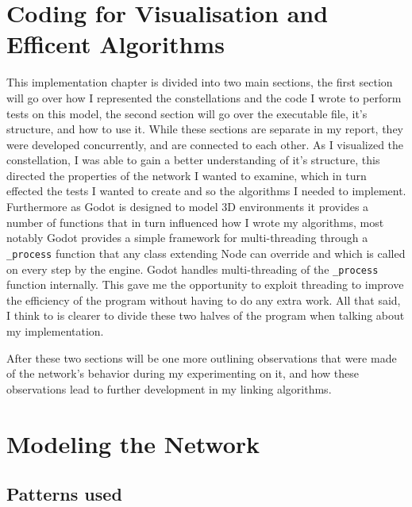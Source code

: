 \documentclass[12pt]{report}
\begin{document}
\section{Coding for Visualisation and Efficent Algorithms}

This implementation chapter is divided into two main sections, the first section will go over how I represented the constellations and the code I wrote to perform tests on this model, the second section will go over the executable file, it's structure, and how to use it. While these sections are separate in my report, they were developed concurrently, and are connected to each other.  As I visualized the constellation, I was able to gain a better understanding of it's structure, this directed the properties of the network I wanted to examine, which in turn effected the tests I wanted to create and so the algorithms I needed to implement. Furthermore as Godot is designed to model 3D environments it provides a number of functions that in turn influenced how I wrote my algorithms, most notably Godot provides a simple framework for multi-threading through a \lstinline{_process} function that any class extending Node can override and which is called on every step by the engine. Godot handles multi-threading of the \lstinline{_process} function internally. This gave me the opportunity to exploit threading to improve the efficiency of the program without having to do any extra work. All that said, I think to is clearer to divide these two halves of the program when talking about my implementation.

After these two sections will be one more outlining observations that were made of the network's behavior during my experimenting on it, and how these observations lead to further development in my linking algorithms.

\section{Modeling the Network}

\subsection{Patterns used}
\end{document}
